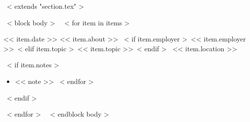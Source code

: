 ~< extends "section.tex" >~

~< block body >~
  ~< for item in items >~
    \begin{samepage}
      \cventry
        {<< item.date >>}
        {<< item.about >>}
        {~< if item.employer >~<< item.employer >>~< elif item.topic >~<< item.topic >>~< endif >~}
        {<< item.location >>}
        {}
        { %
          ~< if item.notes >~
            \begin{itemize}
              ~< for note in item.notes >~
                \item{<< note >>}
              ~< endfor >~
            \end{itemize}
          ~< endif >~
        }
    \end{samepage}
    \vspace{10pt}
  ~< endfor >~
  \vspace{-10pt}
~< endblock body >~
